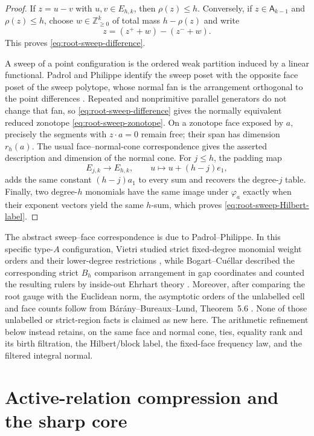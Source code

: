 \documentclass[11pt,reqno]{amsart}
\theoremstyle{definition}
\theoremstyle{remark}
\begin{document}
\begin{proof}
If $z=u-v$ with $u,v\in E_{h,k}$, then $\rho(z)\leq h$.  Conversely, if
$z\in\mathsf A_{k-1}$ and $\rho(z)\leq h$, choose
$w\in\mathbb Z_{\geq0}^k$ of total mass $h-\rho(z)$ and write
\[
 z=(z^++w)-(z^-+w).
\]
This proves \eqref{eq:root-sweep-difference}.

A sweep of a point configuration is the ordered weak partition induced by a
linear functional.  Padrol and Philippe identify the sweep poset with the
opposite face poset of the sweep polytope, whose normal fan is the arrangement
orthogonal to the point differences \cite[Sections~2.1 and~2.3, especially
Definition~2.1 and Proposition~2.2]{PadrolPhilippe2024}.  Repeated and
nonprimitive parallel
generators do not change that fan, so \eqref{eq:root-sweep-difference} gives
the normally equivalent reduced zonotope \eqref{eq:root-sweep-zonotope}.  On
a zonotope face exposed by $a$, precisely the segments with $z\cdot a=0$
remain free; their span has dimension $r_h(a)$.  The usual
face--normal-cone correspondence gives the asserted description and dimension
of the normal cone.  For $j\leq h$, the padding map
\[
 E_{j,k}\longrightarrow E_{h,k},\qquad
 u\longmapsto u+(h-j)e_1,
\]
adds the same constant $(h-j)a_1$ to every sum and recovers the degree-$j$
table.  Finally, two degree-$h$ monomials have the same image under
$\varphi_a$ exactly when their exponent vectors yield the same $h$-sum,
which proves \eqref{eq:root-sweep-Hilbert-label}.
\end{proof}

The abstract sweep--face correspondence is due to Padrol--Philippe.  In this
specific type-$A$ configuration, Vietri studied strict fixed-degree monomial
weight orders and their lower-degree restrictions \cite{Vietri2002}, while
Bogart--Cu\'ellar described the corresponding strict $B_h$ comparison
arrangement in gap coordinates and counted the resulting rulers by
inside-out Ehrhart theory \cite{BogartCuellar2025}.  Moreover, after comparing
the root gauge with the Euclidean norm, the asymptotic orders of the
unlabelled cell and face counts follow from
B\'ar\'any--Bureaux--Lund, Theorem~5.6
\cite{BaranyBureauxLund2018}.  None of those unlabelled or strict-region facts
is claimed as new here.  The arithmetic refinement below instead retains, on
the same face and normal cone, ties, equality rank and its birth filtration,
the Hilbert/block label, the fixed-face frequency law, and the filtered
integral normal.

\section{Active-relation compression and the sharp core}
\label{sec:compression-master}
\end{document}
